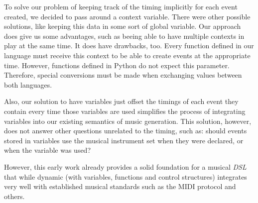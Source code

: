 \documentclass[a4paper,UKenglish,cleveref, autoref]{oasics-v2019}
\begin{document}
To solve our problem of keeping track of the timing implicitly for each event created, we decided to pass around a context variable. There were other possible solutions, like keeping this data in some sort of global variable. Our approach does give us some advantages, such as beeing able to have multiple contexts in play at the same time. It does have drawbacks, too. Every function defined in our language must receive this context to be able to create events at the appropriate time. However, functions defined in Python do not expect this parameter. Therefore, special conversions must be made when exchanging values between both languages.

Also, our solution to have variables just offset the timings of each event they contain every time those variables are used simplifies the process of integrating variables into our existing semantics of music generation. This solution, however, does not answer other questions unrelated to the timing, such as: should events stored in variables use the musical instrument set when they were declared, or when the variable was used?

However, this early work already provides a solid foundation for a musical \textit{DSL} that while dynamic (with variables, functions and control structures) integrates very well with established musical standards such as the MIDI protocol and others.



\end{document}

